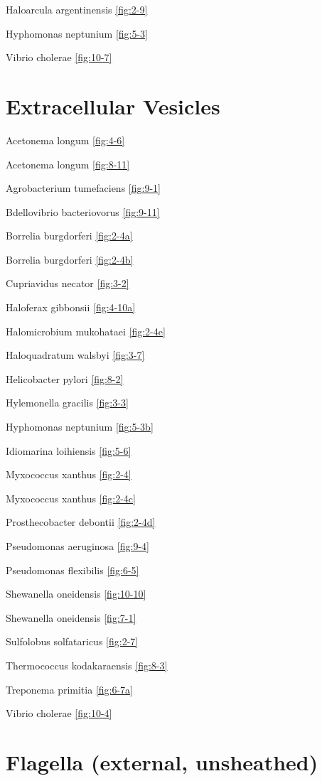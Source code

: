 \documentclass[]{tufte-book}
\begin{document}
Haloarcula argentinensis \ref{fig:2-9}

Hyphomonas neptunium \ref{fig:5-3}

Vibrio cholerae \ref{fig:10-7}

\hypertarget{extracellular-vesicles}{%
\section*{Extracellular Vesicles}\label{extracellular-vesicles}}

Acetonema longum \ref{fig:4-6}

Acetonema longum \ref{fig:8-11}

Agrobacterium tumefaciens \ref{fig:9-1}

Bdellovibrio bacteriovorus \ref{fig:9-11}

Borrelia burgdorferi \ref{fig:2-4a}

Borrelia burgdorferi \ref{fig:2-4b}

Cupriavidus necator \ref{fig:3-2}

Haloferax gibbonsii \ref{fig:4-10a}

Halomicrobium mukohataei \ref{fig:2-4e}

Haloquadratum walsbyi \ref{fig:3-7}

Helicobacter pylori \ref{fig:8-2}

Hylemonella gracilis \ref{fig:3-3}

Hyphomonas neptunium \ref{fig:5-3b}

Idiomarina loihiensis \ref{fig:5-6}

Myxococcus xanthus \ref{fig:2-4}

Myxococcus xanthus \ref{fig:2-4c}

Prosthecobacter debontii \ref{fig:2-4d}

Pseudomonas aeruginosa \ref{fig:9-4}

Pseudomonas flexibilis \ref{fig:6-5}

Shewanella oneidensis \ref{fig:10-10}

Shewanella oneidensis \ref{fig:7-1}

Sulfolobus solfataricus \ref{fig:2-7}

Thermococcus kodakaraensis \ref{fig:8-3}

Treponema primitia \ref{fig:6-7a}

Vibrio cholerae \ref{fig:10-4}

\hypertarget{flagella-external-unsheathed}{%
\section*{Flagella (external, unsheathed)}\label{flagella-external-unsheathed}}
\end{document}
